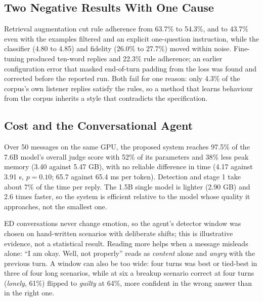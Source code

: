 \documentclass[conference]{IEEEtran}
\begin{document}
\subsection{Two Negative Results With One Cause}
Retrieval augmentation cut rule adherence from 63.7\% to 54.3\%, and to 43.7\% even with the examples filtered and an explicit one-question instruction, while the classifier (4.80 to 4.85) and fidelity (26.0\% to 27.7\%) moved within noise. Fine-tuning produced ten-word replies and 22.3\% rule adherence; an earlier configuration error that masked end-of-turn padding from the loss was found and corrected before the reported run. Both fail for one reason: only 4.3\% of the corpus's own listener replies satisfy the rules, so a method that learns behaviour from the corpus inherits a style that contradicts the specification.

\subsection{Cost and the Conversational Agent}
Over 50 messages on the same GPU, the proposed system reaches 97.5\% of the 7.6B model's overall judge score with 52\% of its parameters and 38\% less peak memory (3.40 against 5.47 GB), with no reliable difference in time (4.17 against 3.91 s, $p=0.10$; 65.7 against 65.4 ms per token). Detection and stage 1 take about 7\% of the time per reply. The 1.5B single model is lighter (2.90 GB) and 2.6 times faster, so the system is efficient relative to the model whose quality it approaches, not the smallest one.

ED conversations never change emotion, so the agent's detector window was chosen on hand-written scenarios with deliberate shifts; this is illustrative evidence, not a statistical result. Reading more helps when a message misleads alone: ``I am okay. Well, not properly'' reads as \textit{content} alone and \textit{angry} with the previous turn. A window can also be too wide: four turns was best or tied-best in three of four long scenarios, while at six a breakup scenario correct at four turns (\textit{lonely}, 61\%) flipped to \textit{guilty} at 64\%, more confident in the wrong answer than in the right one.
\end{document}
